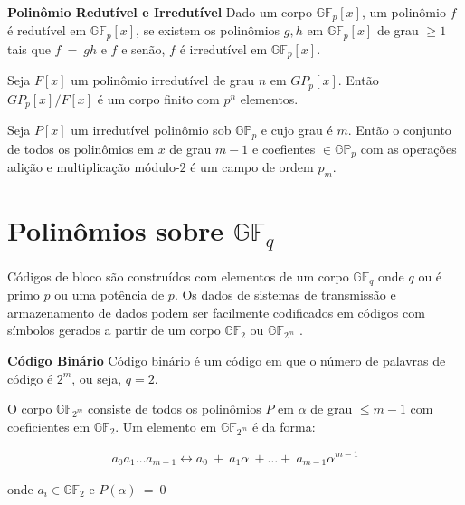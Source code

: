 \begin{definition} {\bf Polinômio Redutível e Irredutível} \label{PolRedIrred}  Dado um corpo $\mathbb{GF}_p[x]$, um polinômio $f$  é redutível em $\mathbb{GF}_p[x]$, se existem os polinômios $g, h$ em $\mathbb{GF}_p[x]$ de grau $\geq 1$ tais que $f\ =\ gh$ e $f$ e senão, $f$ é irredutível em $\mathbb{GF}_p[x]$.
\end{definition}

\begin{proposition}
Seja $F[x]$ um polinômio irredutível de grau $n$ em $GP_p[x]$. Então $GP_p[x]/F[x]$ é um corpo finito com $p^n$ elementos.
\end{proposition}

\begin{theorem} Seja $P[x]$ um irredutível polinômio sob $\mathbb{GP}_p$ e cujo grau é $m$. Então o conjunto de todos os polinômios em $x$ de grau $m-1$ e coefientes $\in \mathbb{GP}_p$ com as operações adição e multiplicação módulo-$2$ é um campo de ordem $p_m$.
\end{theorem}

\section{Polinômios sobre $\mathbb{GF}_q$}

Códigos de bloco são construídos com elementos de um corpo $\mathbb{GF}_q$ onde $q$ ou é primo $p$ ou uma potência de $p$. Os dados de sistemas de transmissão e armazenamento de dados podem ser facilmente codificados em códigos com símbolos gerados a partir de um corpo $\mathbb{GF}_2$ ou $\mathbb{GF}_{2^m}$ \cite{Lin:1983}.

\begin{definition} {\bf Código Binário} \label{CodBin}  Código binário é um código em que o número de palavras de código é $2^m$, ou seja, $q = 2$.
\end{definition}

O corpo $\mathbb{GF}_{2^m}$ consiste de todos os polinômios $P$ em $\alpha$ de grau $\leq m-1$ com coeficientes em $\mathbb{GF}_2$. Um elemento em $\mathbb{GF}_{2^m}$ é da forma: 

\begin{align*}
a_0a_1 \ldots a_{m-1} \leftrightarrow a_0\ +\ a_1\alpha\ + \ldots +\ a_{m-1}\alpha^{m-1}
\end{align*}

onde $a_i \in \mathbb{GF}_2$ e $P(\alpha)\ =\ 0$


